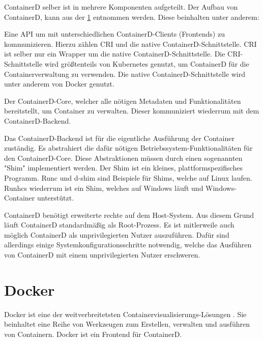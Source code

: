 \begin{figure}[H]
    \label{fig:containerd-architecture}
\end{figure}


ContainerD selber ist in mehrere Komponenten aufgeteilt. Der Aufbau von ContainerD, kann aus der \cref{fig:containerd-architecture} entnommen werden. Diese beinhalten unter anderem:

Eine API um mit unterschiedlichen ContainerD-Clients (Frontends) zu kommunizieren. Hierzu zählen CRI und die native ContainerD-Schnittstelle. CRI ist selber nur ein Wrapper um die native ContainerD-Schnittstelle. Die CRI-Schnittstelle wird größtenteils von Kubernetes genutzt, um ContainerD für die Containerverwaltung zu verwenden. Die native ContainerD-Schnittstelle wird unter anderem von Docker genutzt.

Der ContainerD-Core, welcher alle nötigen Metadaten und Funktionalitäten bereitstellt, um Container zu verwalten. Dieser kommuniziert wiederrum mit dem ContainerD-Backend.

Das ContainerD-Backend ist für die eigentliche Ausführung der Container zuständig. Es abstrahiert die dafür nötigen Betriebssystem-Funktionalitäten für den ContainerD-Core. Diese Abstraktionen müssen durch einen sogenannten "Shim" implementiert werden. Der Shim ist ein kleines, plattformspezifisches Programm. Runc und d-shim sind Beispiele für Shims, welche auf Linux laufen. Runhcs wiederrum ist ein Shim, welches auf Windows läuft und Windows-Container unterstützt.  

ContainerD benötigt erweiterte rechte auf dem Host-System. Aus diesem Grund läuft ContainerD standardmäßig als Root-Prozess. Es ist mitlerweile auch möglich ContainerD als unprivilegierten Nutzer auszuführen. Dafür sind allerdings einige Systemkonfigurationsschritte notwendig, welche das Ausführen von ContainerD mit einem unprivilegierten Nutzer erschweren.

\pagebreak

\section{Docker}

Docker ist eine der weitverbreitetsten Containervisualisierungs-Lösungen \cite{LeadingContainerizationTechnologiesa}. Sie beinhaltet eine Reihe von Werkzeugen zum Erstellen, verwalten und ausführen von Containern. Docker ist ein Frontend für ContainerD.

